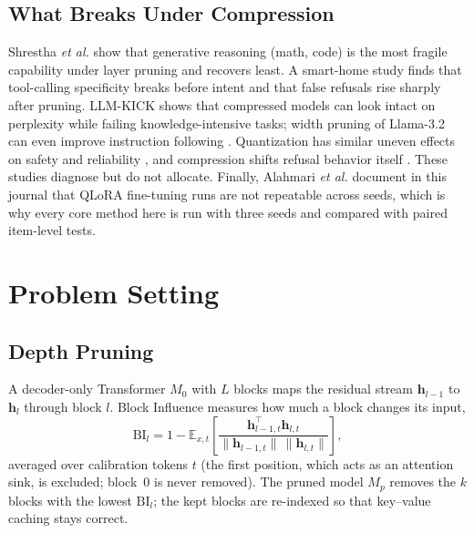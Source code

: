 \documentclass{ieeeaccess}
\newcommand{\Mz}{M_{0}}
\newcommand{\Mp}{M_{p}}
\begin{document}
\subsection{What Breaks Under Compression}
Shrestha \emph{et al.} \cite{limits2026layer} show that generative reasoning (math, code) is the most fragile capability under layer pruning and recovers least. A smart-home study \cite{smarthome2026} finds that tool-calling specificity breaks before intent and that false refusals rise sharply after pruning. LLM-KICK \cite{jaiswal2024truth} shows that compressed models can look intact on perplexity while failing knowledge-intensive tasks; width pruning of Llama-3.2 can even improve instruction following \cite{llama32pruning2025}. Quantization has similar uneven effects on safety and reliability \cite{kharinaev2026quantsafety}, and compression shifts refusal behavior itself \cite{xu2024beyondperplexity,chhabra2025refusal}. These studies diagnose but do not allocate. Finally, Alahmari \emph{et al.} \cite{alahmari2024repeatability} document in this journal that QLoRA fine-tuning runs are not repeatable across seeds, which is why every core method here is run with three seeds and compared with paired item-level tests.

\section{Problem Setting}
\label{sec:setting}

\subsection{Depth Pruning}
A decoder-only Transformer \cite{vaswani2017attention} $\Mz$ with $L$ blocks maps the residual stream $\mathbf{h}_{l-1}$ to $\mathbf{h}_{l}$ through block $l$. Block Influence \cite{men2024shortgpt} measures how much a block changes its input,
\begin{equation}
\mathrm{BI}_l = 1 - \mathbb{E}_{x,t}\!\left[\frac{\mathbf{h}_{l-1,t}^{\top}\mathbf{h}_{l,t}}{\lVert\mathbf{h}_{l-1,t}\rVert\,\lVert\mathbf{h}_{l,t}\rVert}\right],
\label{eq:bi}
\end{equation}
averaged over calibration tokens $t$ (the first position, which acts as an attention sink, is excluded; block~0 is never removed). The pruned model $\Mp$ removes the $k$ blocks with the lowest $\mathrm{BI}_l$; the kept blocks are re-indexed so that key--value caching stays correct.
\end{document}
